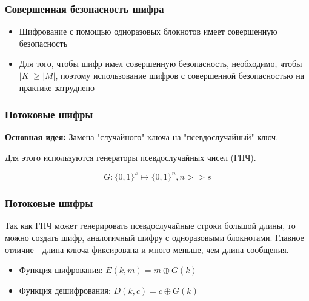 \documentclass{beamer}
\newcommand{\set}[1]{{\lbrace #1 \rbrace}}
\begin{document}
\begin{frame}
  \frametitle{Совершенная безопасность шифра}

  \begin{itemize}
    \item{Шифрование с помощью одноразовых блокнотов имеет совершенную безопасность}
    \item{Для того, чтобы шифр имел совершенную безопасность, необходимо, чтобы $|K| \ge |M|$, поэтому использование
          шифров с совершенной безопасностью на практике затруднено}
  \end{itemize}
\end{frame}


\begin{frame}
  \frametitle{Потоковые шифры}

  \textbf{Основная идея:} Замена "случайного" ключа на "псевдослучайный" ключ.
  \vspace{1em}

  Для этого используются генераторы псевдослучайных чисел (ГПЧ).
  \vspace{1em}

  \[G:\set{0,1}^{s} \mapsto \set{0,1}^{n}, n>>s\]


\end{frame}


\begin{frame}
  \frametitle{Потоковые шифры}

  Так как ГПЧ может генерировать псевдослучайные строки большой длины, то можно создать шифр,
  аналогичный шифру с одноразовыми блокнотами. Главное отличие - длина ключа фиксирована и много меньше, чем длина
  сообщения.

  \begin{itemize}
    \itemsep 2em
    \item{Функция шифрования: \newline
      $E(k,m)=m \oplus G(k)$}
    \item{Функция дешифрования: \newline
      $D(k,c)=c \oplus G(k)$}

  \end{itemize}

\end{frame}
\end{document}

